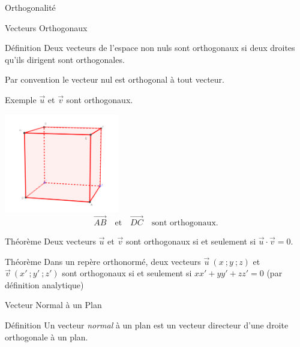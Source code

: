 \documentclass{coursbook}
\begin{document}
    \begin{Gpartie}{Orthogonalité} 
        \begin{Spartie}{Vecteurs Orthogonaux} 
            \begin{SSpartie}{Définition} 
                Deux vecteurs de l'espace non nuls sont orthogonaux si deux droites qu'ils dirigent sont orthogonales.

                Par convention le vecteur nul est orthogonal à tout vecteur.
                \pagebreak
                \begin{SSSpartie}{Exemple} 
                    $\vec{u}$ et $\vec{v}$ sont orthogonaux.

                    \begin{center}
                            \includegraphics[width=5cm]{rsc/12fig2.png}
                            \[\overrightarrow{AB}\quad\text{et}\quad\overrightarrow{DC}\quad\text{sont orthogonaux.}\]
                        \parbox{\linewidth}{}
                    \end{center}
                \end{SSSpartie}
            \end{SSpartie}
            \begin{SSpartie}{Théorème} 
                Deux vecteurs $\vec{u}$ et $\vec{v}$ sont orthogonaux si et seulement si $\vec{u}\cdot\vec{v}=0$.
            \end{SSpartie}
            \begin{SSpartie}{Théorème} 
                Dans un repère orthonormé, deux vecteurs $\vec{u}~\left(x~;y~;z\right)$ et $\vec{v}~\left(x'~;y'~;z'\right)$ sont orthogonaux si et seulement si $xx'+yy'+zz'=0$ (par définition analytique)
            \end{SSpartie}
        \end{Spartie}
        \begin{Spartie}{Vecteur Normal à un Plan} 
            \begin{SSpartie}{Définition} 
                Un vecteur \emph{normal} à un plan est un vecteur directeur d'une droite orthogonale à un plan.
    

\end{SSpartie}
\end{Spartie}
\end{Gpartie}
\end{document}
